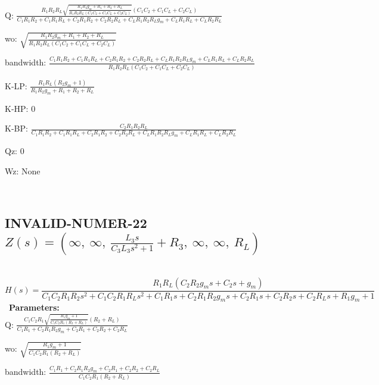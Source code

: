 \documentclass{article}
\begin{document}
Q: $\frac{R_{1} R_{2} R_{L} \sqrt{\frac{R_{1} R_{2} g_{m} + R_{1} + R_{2} + R_{L}}{R_{1} R_{2} R_{L} \left(C_{1} C_{2} + C_{1} C_{L} + C_{2} C_{L}\right)}} \left(C_{1} C_{2} + C_{1} C_{L} + C_{2} C_{L}\right)}{C_{1} R_{1} R_{2} + C_{1} R_{1} R_{L} + C_{2} R_{1} R_{2} + C_{2} R_{2} R_{L} + C_{L} R_{1} R_{2} R_{L} g_{m} + C_{L} R_{1} R_{L} + C_{L} R_{2} R_{L}}$\ 

wo: $\sqrt{\frac{R_{1} R_{2} g_{m} + R_{1} + R_{2} + R_{L}}{R_{1} R_{2} R_{L} \left(C_{1} C_{2} + C_{1} C_{L} + C_{2} C_{L}\right)}}$\ 

bandwidth: $\frac{C_{1} R_{1} R_{2} + C_{1} R_{1} R_{L} + C_{2} R_{1} R_{2} + C_{2} R_{2} R_{L} + C_{L} R_{1} R_{2} R_{L} g_{m} + C_{L} R_{1} R_{L} + C_{L} R_{2} R_{L}}{R_{1} R_{2} R_{L} \left(C_{1} C_{2} + C_{1} C_{L} + C_{2} C_{L}\right)}$\ 

K-LP: $\frac{R_{1} R_{L} \left(R_{2} g_{m} + 1\right)}{R_{1} R_{2} g_{m} + R_{1} + R_{2} + R_{L}}$\ 

K-HP: $0$\ 

K-BP: $\frac{C_{2} R_{1} R_{2} R_{L}}{C_{1} R_{1} R_{2} + C_{1} R_{1} R_{L} + C_{2} R_{1} R_{2} + C_{2} R_{2} R_{L} + C_{L} R_{1} R_{2} R_{L} g_{m} + C_{L} R_{1} R_{L} + C_{L} R_{2} R_{L}}$\ 

Qz: $0$\ 

Wz: $\text{None}$\ 

\ 

\subsection{INVALID-NUMER-22 $Z(s) = \left( \infty, \  \infty, \  \frac{L_{3} s}{C_{3} L_{3} s^{2} + 1} + R_{3}, \  \infty, \  \infty, \  R_{L}\right)$ } \ 
\textbf{\[H(s) = \frac{R_{1} R_{L} \left(C_{2} R_{2} g_{m} s + C_{2} s + g_{m}\right)}{C_{1} C_{2} R_{1} R_{2} s^{2} + C_{1} C_{2} R_{1} R_{L} s^{2} + C_{1} R_{1} s + C_{2} R_{1} R_{2} g_{m} s + C_{2} R_{1} s + C_{2} R_{2} s + C_{2} R_{L} s + R_{1} g_{m} + 1}\] } \ 
\textbf{Parameters:}\\ 

Q: $\frac{C_{1} C_{2} R_{1} \sqrt{\frac{R_{1} g_{m} + 1}{C_{1} C_{2} R_{1} \left(R_{2} + R_{L}\right)}} \left(R_{2} + R_{L}\right)}{C_{1} R_{1} + C_{2} R_{1} R_{2} g_{m} + C_{2} R_{1} + C_{2} R_{2} + C_{2} R_{L}}$\ 

wo: $\sqrt{\frac{R_{1} g_{m} + 1}{C_{1} C_{2} R_{1} \left(R_{2} + R_{L}\right)}}$\ 

bandwidth: $\frac{C_{1} R_{1} + C_{2} R_{1} R_{2} g_{m} + C_{2} R_{1} + C_{2} R_{2} + C_{2} R_{L}}{C_{1} C_{2} R_{1} \left(R_{2} + R_{L}\right)}$\ 
\end{document}
